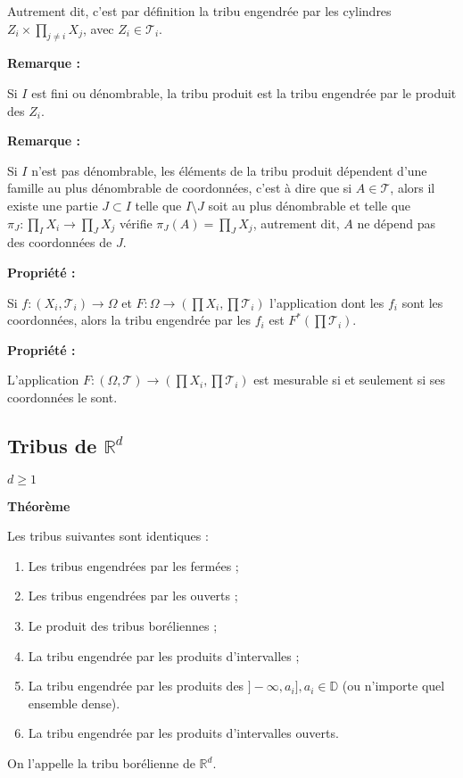 \documentclass[10pt,a4paper,notitlepage ]{report}
\newcommand{\R}{\mathbb R}
\newcommand{\T}{\mathcal T}
\newcommand{\1}{\mathds 1}
\newcounter{th}
\newenvironment{theorem}[1][]{
\refstepcounter{th}
\begin{tcolorbox}
	\textbf{Théorème \theth \ #1}
	
	
}{\end{tcolorbox}}
\newenvironment{propriete}[1][]{
	\begin{tcolorbox}
		\textbf{Propriété #1 : }
}
{\end{tcolorbox}}
\newenvironment{rem}{
	
		\textbf{Remarque :}}{}
\begin{document}
Autrement dit, c'est par définition la tribu engendrée par les cylindres $Z_i \times \prod_{j \neq i} X_j $, avec $Z_i \in \T_i $. 


\begin{rem}

Si $I$ est fini ou dénombrable, la tribu produit est la tribu engendrée par le produit des $Z_i$. 

\end{rem}

\begin{rem}
	
Si $I$ n'est pas dénombrable, les éléments de la tribu produit dépendent d'une famille au plus dénombrable de coordonnées, c'est à dire que si $A \in \T$, alors il existe une partie $J \subset I$ telle que $I \setminus J$ soit au plus dénombrable et telle que $\pi_J : \prod_I X_i \rightarrow \prod_J X_j$ vérifie $\pi_J(A) =\prod_J X_j$, autrement dit, $A$ ne dépend pas des coordonnées de $J$.
\end{rem}

\begin{propriete}

Si $f : (X_i , \T_i ) \rightarrow \Omega$ et $F : \Omega \rightarrow ( \prod X_i , \prod \T _i ) $ l'application dont les $f_i$ sont les coordonnées, alors la tribu engendrée par les $f_i$ est $F^*(\prod \T_i ) $.

\end{propriete}

\begin{propriete}

L'application $F : ( \Omega , \T ) \rightarrow ( \prod X_i , \prod \T_i ) $ est mesurable si et seulement si ses coordonnées le sont.

\end{propriete}


\subsection{Tribus de $\R ^d$}

$d \geq 1 $ \\

\begin{theorem}
Les tribus suivantes sont identiques :
\begin{enumerate}
\item Les tribus engendrées par les fermées ;
\item Les tribus engendrées par les ouverts ;
\item Le produit des tribus boréliennes ;
\item La tribu engendrée par les produits d'intervalles ;
\item La tribu engendrée par les produits des $]-\infty , a_i ], a_i \in \mathbb{D} $ (ou n'importe quel ensemble dense).
\item La tribu engendrée par les produits d'intervalles ouverts. 
\end{enumerate}

On l'appelle la tribu borélienne de $\R ^d $.

\end{theorem}
\end{document}
